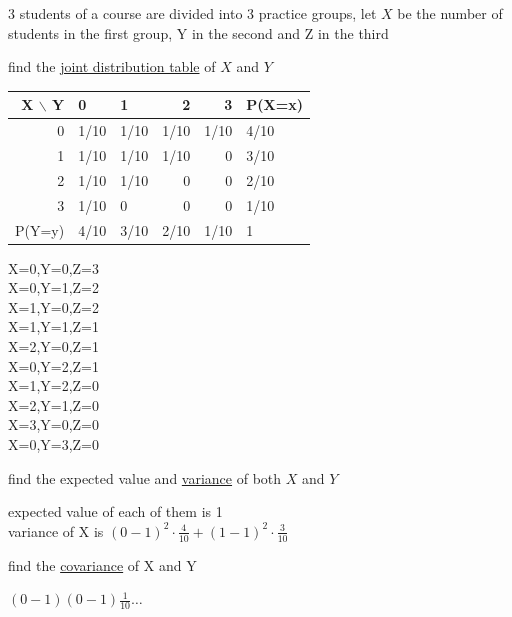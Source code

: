 \documentclass[a4paper,12pt]{article}
\begin{document}
\begin{question}
3 students of a course are divided into 3 practice groups, let \(X\) be the number of students in the first group, Y in the second and Z in the third\\
\begin{subquestion}
find the \href{20230123141739-joint_probability_table.org}{joint distribution table} of \(X\) and \(Y\)\\
\begin{answer}
\begin{tabular}{rllrrl}
X $\backslash$ Y & 0 & 1 & 2 & 3 & P(X=x)\\
\hline
0 & 1/10 & 1/10 & 1/10 & 1/10 & 4/10\\
1 & 1/10 & 1/10 & 1/10 & 0 & 3/10\\
2 & 1/10 & 1/10 & 0 & 0 & 2/10\\
3 & 1/10 & 0 & 0 & 0 & 1/10\\
P(Y=y) & 4/10 & 3/10 & 2/10 & 1/10 & 1\\
\end{tabular}
X=0,Y=0,Z=3\\
X=0,Y=1,Z=2\\
X=1,Y=0,Z=2\\
X=1,Y=1,Z=1\\
X=2,Y=0,Z=1\\
X=0,Y=2,Z=1\\
X=1,Y=2,Z=0\\
X=2,Y=1,Z=0\\
X=3,Y=0,Z=0\\
X=0,Y=3,Z=0\\
\end{answer}
\end{subquestion}
\begin{subquestion}
find the expected value and \href{20230113164748-variance.org}{variance} of both \(X\) and \(Y\)\\
\begin{answer}
expected value of each of them is 1\\
variance of X is \((0-1)^2 \cdot \frac{4}{10} + (1-1)^2 \cdot \frac{3}{10}\)\\
\end{answer}
\end{subquestion}
\begin{subquestion}
find the \href{20230122214906-covariance.org}{covariance} of X and Y\\
\begin{answer}
\((0-1)(0-1)\frac{1}{10} \dots\)\\
\end{answer}
\end{subquestion}
\end{question}
\end{document}
